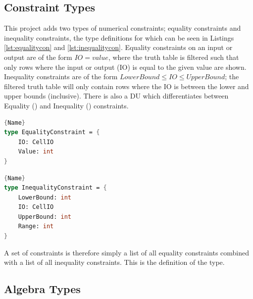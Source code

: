 \subsection{Constraint Types}
This project adds two types of numerical constraints; equality constraints and inequality constraints, the type definitions for which can be seen in Listings \ref{lst:equalitycon} and \ref{lst:inequalitycon}. Equality constraints on an input or output are of the form $IO = value$, where the truth table is filtered such that only rows where the input or output (IO) is equal to the given value are shown. Inequality constraints are of the form $LowerBound \leq IO \leq UpperBound$; the filtered truth table will only contain rows where the IO is between the lower and upper bounds (inclusive). There is also a  DU which differentiates between Equality () and Inequality () constraints.

\begin{center}
\noindent\begin{minipage}{.45\textwidth}
\begin{lstlisting}[caption=Definition for Equality Constraint,frame=tlrb, language=FSharp, label=lst:equalitycon]{Name}
type EqualityConstraint = {
    IO: CellIO
    Value: int
}
\end{lstlisting}
\end{minipage}\hfill
\begin{minipage}{.45\textwidth}
\begin{lstlisting}[caption=Definition for Inequality Constraint,frame=tlrb, language=FSharp, label=lst:inequalitycon]{Name}
type InequalityConstraint = {
    LowerBound: int
    IO: CellIO
    UpperBound: int
    Range: int
}
\end{lstlisting} 
\end{minipage}
\end{center}

A set of constraints is therefore simply a list of all equality constraints combined with a list of all inequality constraints. This is the definition of the  type.

\subsection{Algebra Types}
